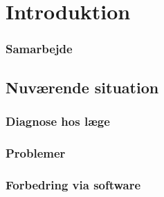 \section{Introduktion}

\begin{frame}
\frametitle{Samarbejde}

\end{frame}

\subsection{Nuværende situation}

\begin{frame}
\frametitle{Diagnose hos læge}

\end{frame}

\begin{frame}
\frametitle{Problemer}

\end{frame}

\begin{frame}
\frametitle{Forbedring via software}

\end{frame}
